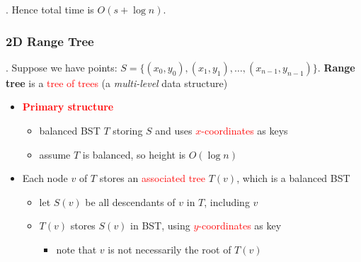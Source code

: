 \documentclass{article}
\begin{document}
\begin{result}[].
    Hence total time is $O(s + \log n)$. 
\end{result}

\subsubsection{2D Range Tree}

\begin{deff}.
    Suppose we have points: $S = \{(x_0, y_0), (x_1, y_1), \dots, (x_{n-1}, y_{n-1})\}$. \textbf{Range tree} is a \textcolor{red}{tree of trees} (a \textit{multi-level} data structure) \begin{itemize}
        \item \textcolor{red}{\textbf{Primary structure}}
        \begin{itemize}
            \item balanced BST $T$ storing $S$ and uses \textcolor{red}{$x$-coordinates} as keys
            \item assume $T$ is balanced, so height is $O(\log n)$
        \end{itemize}
        \item Each node $v$ of $T$ stores an \textcolor{red}{associated tree} $T(v)$, which is a balanced BST
        \begin{itemize}
            \item let $S(v)$ be all descendants of $v$ in $T$, including $v$
            \item $T(v)$ stores $S(v)$ in BST, using \textcolor{red}{$y$-coordinates} as key
            \begin{itemize}
                \item note that $v$ is not necessarily the root of $T(v)$
            \end{itemize}
        \end{itemize}
    \end{itemize}
\end{deff}
\end{document}
